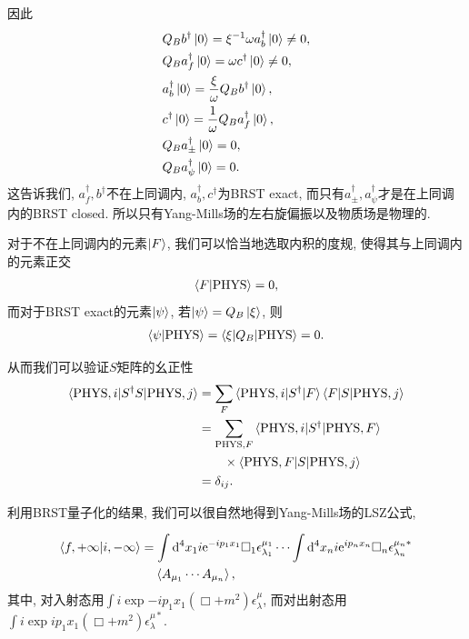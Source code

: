 因此
\begin{align}
    & Q_Bb^\dagger\ket0=\xi^{-1}\omega a_b^\dagger\ket0\neq0, \notag\\
    & Q_Ba_f^\dagger\ket0=\omega c^\dagger\ket 0\neq0, \notag\\
    & a^\dagger_b\ket0=\frac\xi\omega Q_Bb^\dagger\ket0, \notag\\
    & c^\dagger\ket0=\frac1\omega Q_Ba^\dagger_f\ket0, \notag\\
    & Q_Ba^\dagger_{\pm}\ket0=0,\notag\\
    & Q_Ba^\dagger_{\psi}\ket0=0.
\end{align}
这告诉我们, $a^\dagger_f, b^\dagger$不在上同调内, $a^\dagger_b, c^\dagger$为BRST exact, 而只有$a^\dagger_{\pm}, a^\dagger_{\psi}$才是在上同调内的BRST closed. 所以只有Yang-Mills场的左右旋偏振以及物质场是物理的.

对于不在上同调内的元素$\ket F$, 我们可以恰当地选取内积的度规, 使得其与上同调内的元素正交
\begin{align}
    \braket{F|\mathrm{PHYS}}=0,
\end{align}
而对于BRST exact的元素$\ket\psi$, 若$\ket\psi=Q_B\ket\xi$, 则
\begin{align}
    \braket{\psi|\mathrm{PHYS}}=\braket{\xi|Q_B|\mathrm{PHYS}}=0.
\end{align}

从而我们可以验证$S$矩阵的幺正性
\begin{align}
    \braket{\mathrm{PHYS}, i|S^\dagger S|\mathrm{PHYS}, j}&=\sum_F \braket{\mathrm{PHYS}, i|S^\dagger|F}\braket{F|S|\mathrm{PHYS}, j}\notag\\
    &=\sum_{\mathrm{PHYS}, F}\braket{\mathrm{PHYS}, i|S^\dagger|\mathrm{PHYS}, F}\notag\\
    &\qquad\times\braket{\mathrm{PHYS}, F|S|\mathrm{PHYS}, j}\notag\\
    &=\delta_{ij}.
\end{align}

利用BRST量子化的结果, 我们可以很自然地得到Yang-Mills场的LSZ公式,
\begin{theorem}\label{LSZformula-gauge}
    \begin{align}
        \braket{f, +\infty|i, -\infty}&=\int\mathrm d^4x_1 i\mathrm e^{-ip_1x_1}\Box_1\epsilon^{\mu_1}_{\lambda_1}\cdots\int\mathrm d^4x_n i\mathrm e^{ip_nx_n}\Box_n\epsilon^{\mu_n*}_{\lambda_n}\notag\\
        &\;\;\;\;\braket{A_{\mu_1}\cdots A_{\mu_n}},
    \end{align}
    其中, 对入射态用$\int i\exp{-ip_1x_1}(\Box+m^2)\epsilon^\mu_\lambda$, 而对出射态用$\int i\exp{ip_1x_1}(\Box+m^2)\epsilon^{\mu*}_\lambda$.
\end{theorem}

